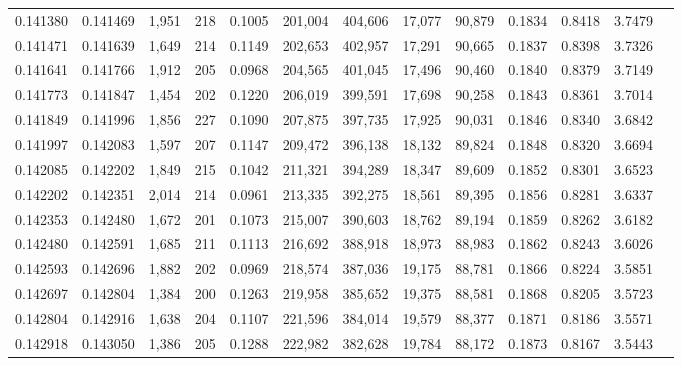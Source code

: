 \begin{tabular}{rrrrrrrrrrrrr}
0.141380 & 0.141469 & 1,951 & 218 &                                     0.1005 & 201,004 & 404,606 &  17,077 &  90,879 & 0.1834 & 0.8418 & 3.7479 \\
0.141471 & 0.141639 & 1,649 & 214 &                                     0.1149 & 202,653 & 402,957 &  17,291 &  90,665 & 0.1837 & 0.8398 & 3.7326 \\
0.141641 & 0.141766 & 1,912 & 205 &                                     0.0968 & 204,565 & 401,045 &  17,496 &  90,460 & 0.1840 & 0.8379 & 3.7149 \\
0.141773 & 0.141847 & 1,454 & 202 &                                     0.1220 & 206,019 & 399,591 &  17,698 &  90,258 & 0.1843 & 0.8361 & 3.7014 \\
0.141849 & 0.141996 & 1,856 & 227 &                                     0.1090 & 207,875 & 397,735 &  17,925 &  90,031 & 0.1846 & 0.8340 & 3.6842 \\
0.141997 & 0.142083 & 1,597 & 207 &                                     0.1147 & 209,472 & 396,138 &  18,132 &  89,824 & 0.1848 & 0.8320 & 3.6694 \\
0.142085 & 0.142202 & 1,849 & 215 &                                     0.1042 & 211,321 & 394,289 &  18,347 &  89,609 & 0.1852 & 0.8301 & 3.6523 \\
0.142202 & 0.142351 & 2,014 & 214 &                                     0.0961 & 213,335 & 392,275 &  18,561 &  89,395 & 0.1856 & 0.8281 & 3.6337 \\
0.142353 & 0.142480 & 1,672 & 201 &                                     0.1073 & 215,007 & 390,603 &  18,762 &  89,194 & 0.1859 & 0.8262 & 3.6182 \\
0.142480 & 0.142591 & 1,685 & 211 &                                     0.1113 & 216,692 & 388,918 &  18,973 &  88,983 & 0.1862 & 0.8243 & 3.6026 \\
0.142593 & 0.142696 & 1,882 & 202 &                                     0.0969 & 218,574 & 387,036 &  19,175 &  88,781 & 0.1866 & 0.8224 & 3.5851 \\
0.142697 & 0.142804 & 1,384 & 200 &                                     0.1263 & 219,958 & 385,652 &  19,375 &  88,581 & 0.1868 & 0.8205 & 3.5723 \\
0.142804 & 0.142916 & 1,638 & 204 &                                     0.1107 & 221,596 & 384,014 &  19,579 &  88,377 & 0.1871 & 0.8186 & 3.5571 \\
0.142918 & 0.143050 & 1,386 & 205 &                                     0.1288 & 222,982 & 382,628 &  19,784 &  88,172 & 0.1873 & 0.8167 & 3.5443 \\

\end{tabular}
